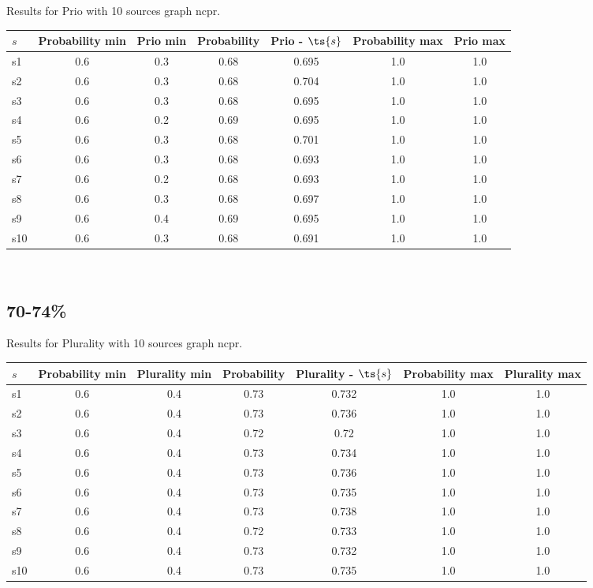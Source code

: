 \documentclass{article}
\begin{document}
\noindent Results for Prio with 10 sources graph ncpr.

\noindent\begin{tabular}{|l|c|c|c|c|c|c|}
\hline
$s$& Probability min & Prio min & Probability & Prio - $\ts{s}$ & Probability max & Prio max\\
\hline
s1 &0.6 & 0.3 & 0.68 & 0.695 & 1.0 & 1.0\\
\hline
s2 &0.6 & 0.3 & 0.68 & 0.704 & 1.0 & 1.0\\
\hline
s3 &0.6 & 0.3 & 0.68 & 0.695 & 1.0 & 1.0\\
\hline
s4 &0.6 & 0.2 & 0.69 & 0.695 & 1.0 & 1.0\\
\hline
s5 &0.6 & 0.3 & 0.68 & 0.701 & 1.0 & 1.0\\
\hline
s6 &0.6 & 0.3 & 0.68 & 0.693 & 1.0 & 1.0\\
\hline
s7 &0.6 & 0.2 & 0.68 & 0.693 & 1.0 & 1.0\\
\hline
s8 &0.6 & 0.3 & 0.68 & 0.697 & 1.0 & 1.0\\
\hline
s9 &0.6 & 0.4 & 0.69 & 0.695 & 1.0 & 1.0\\
\hline
s10 &0.6 & 0.3 & 0.68 & 0.691 & 1.0 & 1.0\\
\hline
\end{tabular}\\

\newpage

\subsection{70-74\%}

\noindent Results for Plurality with 10 sources graph ncpr.

\noindent\begin{tabular}{|l|c|c|c|c|c|c|}
\hline
$s$& Probability min & Plurality min & Probability & Plurality - $\ts{s}$ & Probability max & Plurality max\\
\hline
s1 &0.6 & 0.4 & 0.73 & 0.732 & 1.0 & 1.0\\
\hline
s2 &0.6 & 0.4 & 0.73 & 0.736 & 1.0 & 1.0\\
\hline
s3 &0.6 & 0.4 & 0.72 & 0.72 & 1.0 & 1.0\\
\hline
s4 &0.6 & 0.4 & 0.73 & 0.734 & 1.0 & 1.0\\
\hline
s5 &0.6 & 0.4 & 0.73 & 0.736 & 1.0 & 1.0\\
\hline
s6 &0.6 & 0.4 & 0.73 & 0.735 & 1.0 & 1.0\\
\hline
s7 &0.6 & 0.4 & 0.73 & 0.738 & 1.0 & 1.0\\
\hline
s8 &0.6 & 0.4 & 0.72 & 0.733 & 1.0 & 1.0\\
\hline
s9 &0.6 & 0.4 & 0.73 & 0.732 & 1.0 & 1.0\\
\hline
s10 &0.6 & 0.4 & 0.73 & 0.735 & 1.0 & 1.0\\
\hline
\end{tabular}\\
\end{document}
